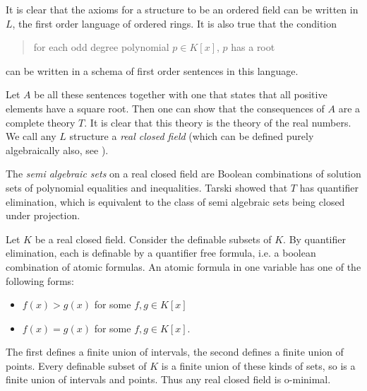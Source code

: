 \documentclass[12pt]{article}
\begin{document}
It is clear that the axioms for a structure to be an ordered field can be written in $L$, the first order language of ordered rings.  It is also true that the condition 
\begin{quote}
for each odd degree polynomial $p \in K[x]$, $p$ has a root
\end{quote}
can be written in a schema of first order sentences in this language.


Let $A$ be all these sentences together with one that states that all positive elements have a square root. 
Then one can show that the consequences of $A$ are a complete theory $T$. 
It is clear that this theory is the theory of the real numbers. We call any $L$ structure a {\em real closed field} (which can be defined purely algebraically also, see ).

\medskip

The {\em semi algebraic sets} on a real closed field are Boolean combinations of solution sets of polynomial equalities and inequalities.  
Tarski showed that $T$ has quantifier elimination, which is equivalent to the class of semi algebraic sets being closed under projection. 

\medskip

Let $K$ be a real closed field.  Consider the definable subsets of $K$.  By quantifier elimination, 
each is definable by a quantifier free formula, i.e. a boolean combination of atomic formulas. 
An atomic formula in one variable has one of the following forms:
\begin{itemize} \item $f(x)>g(x)$ for some $f,g \in K[x]$
\item $f(x)=g(x)$ for some $f,g \in K[x]$.
\end{itemize}
The first defines a finite union of intervals, the second defines a finite union of points. Every definable subset of $K$ is a finite union of these kinds of sets, so is a finite union of intervals and points.
Thus any real closed field is o-minimal.
\end{document}
